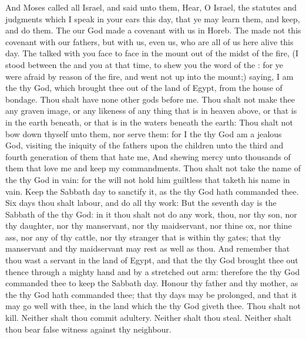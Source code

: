 \begin{biblechapter} %
 And Moses called all Israel, and said unto them, Hear, O Israel, the statutes and judgments which I speak in your ears this day, that ye may learn them, and keep, and do them.
\verse The \LORD our God made a covenant with us in Horeb.
\verse The \LORD made not this covenant with our fathers, but with us, even us, who are all of us here alive this day.
\verse The \LORD talked with you face to face in the mount out of the midst of the fire,
\verse (I stood between the \LORD and you at that time, to shew you the word of the \LORD: for ye were afraid by reason of the fire, and went not up into the mount;) saying,
\verse I am the \LORD thy God, which brought thee out of the land of Egypt, from the house of bondage.
\verse Thou shalt have none other gods before me.
\verse Thou shalt not make thee any graven image, or any likeness of any thing that is in heaven above, or that is in the earth beneath, or that is in the waters beneath the earth:
\verse Thou shalt not bow down thyself unto them, nor serve them: for I the \LORD thy God am a jealous God, visiting the iniquity of the fathers upon the children unto the third and fourth generation of them that hate me,
\verse And shewing mercy unto thousands of them that love me and keep my commandments.
\verse Thou shalt not take the name of the \LORD thy God in vain: for the \LORD will not hold him guiltless that taketh his name in vain.
\verse Keep the Sabbath day to sanctify it, as the \LORD thy God hath commanded thee.
\verse Six days thou shalt labour, and do all thy work:
\verse But the seventh day is the Sabbath of the \LORD thy God: in it thou shalt not do any work, thou, nor thy son, nor thy daughter, nor thy manservant, nor thy maidservant, nor thine ox, nor thine ass, nor any of thy cattle, nor thy stranger that is within thy gates; that thy manservant and thy maidservant may rest as well as thou.
\verse And remember that thou wast a servant in the land of Egypt, and that the \LORD thy God brought thee out thence through a mighty hand and by a stretched out arm: therefore the \LORD thy God commanded thee to keep the Sabbath day.
\verse Honour thy father and thy mother, as the \LORD thy God hath commanded thee; that thy days may be prolonged, and that it may go well with thee, in the land which the \LORD thy God giveth thee.
\verse Thou shalt not kill.
\verse Neither shalt thou commit adultery.
\verse Neither shalt thou steal.
\verse Neither shalt thou bear false witness against thy neighbour.

\end{biblechapter}
